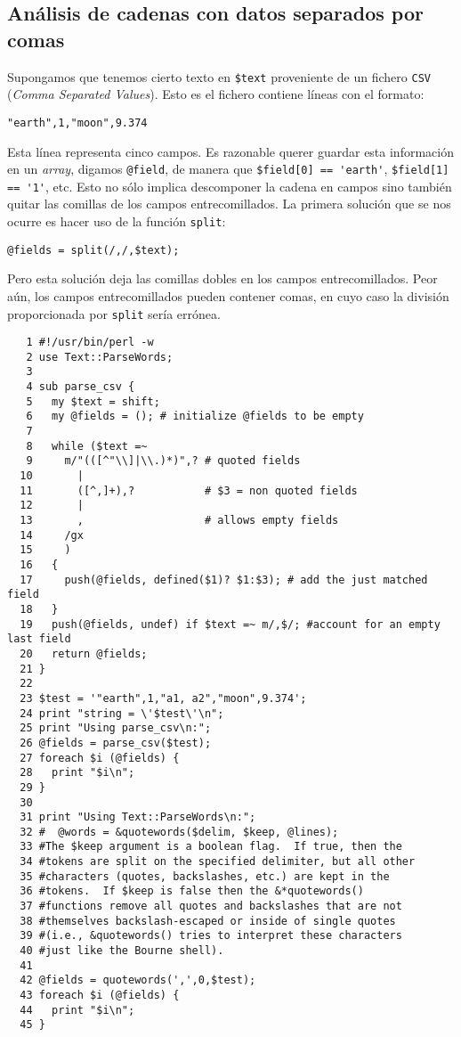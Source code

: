 \subsection{Análisis de cadenas con datos separados por comas}
\label{section:csv}
Supongamos que tenemos cierto texto en \verb|$text| proveniente
de un fichero \verb|CSV| (\emph{Comma Separated Values}). Esto es
el fichero contiene líneas con el formato:

\begin{verbatim}
"earth",1,"moon",9.374
\end{verbatim}

Esta línea representa cinco campos.
Es razonable querer guardar esta información en un \emph{array},
digamos \verb|@field|, de manera que \verb|$field[0] == 'earth'|,
\verb|$field[1] == '1'|, etc.
Esto no sólo implica descomponer la cadena en campos sino
también quitar las comillas de los campos entrecomillados.
La primera solución que se nos ocurre es hacer uso de la
función \verb|split|:

\begin{verbatim}
@fields = split(/,/,$text);
\end{verbatim}

Pero esta solución deja las comillas dobles en  los campos
entrecomillados.  Peor aún, los campos entrecomillados pueden contener
comas, en cuyo caso  la división proporcionada por \verb|split| sería
errónea. 

\begin{verbatim}
   1 #!/usr/bin/perl -w
   2 use Text::ParseWords;
   3 
   4 sub parse_csv {
   5   my $text = shift;
   6   my @fields = (); # initialize @fields to be empty
   7 
   8   while ($text =~ 
   9     m/"(([^"\\]|\\.)*)",? # quoted fields
  10       | 
  11       ([^,]+),?           # $3 = non quoted fields
  12       | 
  13       ,                   # allows empty fields
  14     /gx 
  15     )
  16   {
  17     push(@fields, defined($1)? $1:$3); # add the just matched field
  18   }
  19   push(@fields, undef) if $text =~ m/,$/; #account for an empty last field
  20   return @fields;
  21 }
  22        
  23 $test = '"earth",1,"a1, a2","moon",9.374';
  24 print "string = \'$test\'\n";
  25 print "Using parse_csv\n:";
  26 @fields = parse_csv($test);
  27 foreach $i (@fields) {
  28   print "$i\n";
  29 }
  30 
  31 print "Using Text::ParseWords\n:";
  32 #  @words = &quotewords($delim, $keep, @lines);  
  33 #The $keep argument is a boolean flag.  If true, then the
  34 #tokens are split on the specified delimiter, but all other
  35 #characters (quotes, backslashes, etc.) are kept in the
  36 #tokens.  If $keep is false then the &*quotewords()
  37 #functions remove all quotes and backslashes that are not
  38 #themselves backslash-escaped or inside of single quotes
  39 #(i.e., &quotewords() tries to interpret these characters
  40 #just like the Bourne shell). 
  41 
  42 @fields = quotewords(',',0,$test);
  43 foreach $i (@fields) {
  44   print "$i\n";
  45 }
\end{verbatim}

